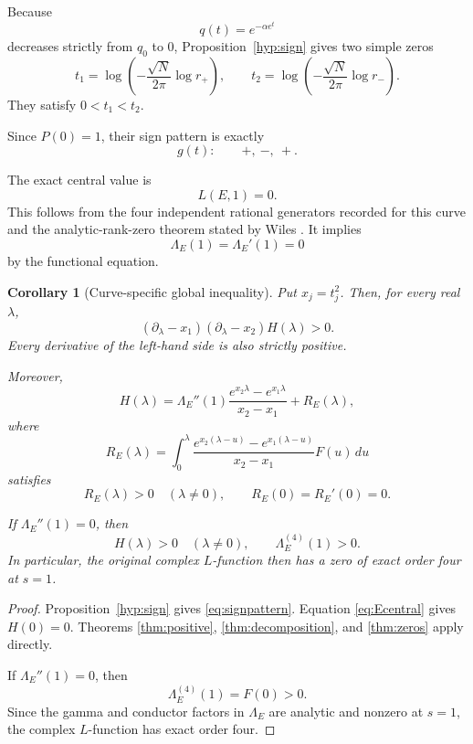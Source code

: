 \documentclass[11pt]{article}
\newtheorem{corollary}[theorem]{Corollary}
\begin{document}
Because
\[
q(t)=e^{-\alpha e^t}
\]
decreases strictly from $q_0$ to $0$,
Proposition~\ref{hyp:sign} gives two
simple zeros
\[
t_1=
\log\left(-\frac{\sqrt N}{2\pi}\log r_+\right),
\qquad
t_2=
\log\left(-\frac{\sqrt N}{2\pi}\log r_-\right).
\]
They satisfy $0<t_1<t_2$.

Since $P(0)=1$, their sign pattern is
exactly
\[
g(t):\qquad +,\ -,\ +.
\]

The exact central value is
\begin{equation}
L(E,1)=0.
\label{eq:Ecentral}
\end{equation}
This follows from the four independent rational generators recorded for this curve and the analytic-rank-zero theorem stated by Wiles \cite{lmfdb,wiles}.
It implies
\[
\Lambda_E(1)=\Lambda_E'(1)=0
\]
by the functional equation.

\begin{corollary}[Curve-specific global inequality]
\label{cor:curve}
Put
$x_j=t_j^2$. Then, for every real $\lambda$,
\begin{equation}
\boxed{
(\partial_\lambda-x_1)
(\partial_\lambda-x_2)H(\lambda)>0.
}
\label{eq:curvepositive}
\end{equation}
Every derivative of the left-hand side
is also strictly positive.

Moreover,
\begin{equation}
\boxed{
H(\lambda)=
\Lambda_E''(1)
\frac{e^{x_2\lambda}-e^{x_1\lambda}}
{x_2-x_1}
+R_E(\lambda),
}
\label{eq:curveidentity}
\end{equation}
where
\[
R_E(\lambda)=
\int_0^\lambda
\frac{e^{x_2(\lambda-u)}
      -e^{x_1(\lambda-u)}}
{x_2-x_1}
F(u)\,du
\]
satisfies
\[
R_E(\lambda)>0\quad(\lambda\ne0),
\qquad
R_E(0)=R_E'(0)=0.
\]

If $\Lambda_E''(1)=0$, then
\[
H(\lambda)>0\quad(\lambda\ne0),
\qquad
\Lambda_E^{(4)}(1)>0.
\]
In particular, the original complex
$L$-function then has a zero of
exact order four at $s=1$.
\end{corollary}

\begin{proof}
Proposition~\ref{hyp:sign} gives
\eqref{eq:signpattern}. Equation
\eqref{eq:Ecentral} gives $H(0)=0$.
Theorems \ref{thm:positive},
\ref{thm:decomposition}, and
\ref{thm:zeros} apply directly.

If $\Lambda_E''(1)=0$, then
\[
\Lambda_E^{(4)}(1)=F(0)>0.
\]
Since the gamma and conductor factors
in $\Lambda_E$ are analytic and nonzero
at $s=1$, the complex $L$-function
has exact order four.
\end{proof}
\end{document}
